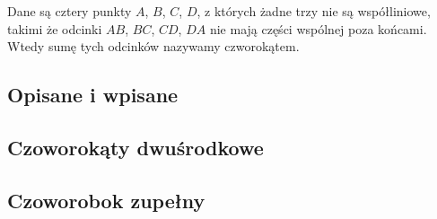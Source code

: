 %

\begin{definition}[czworokąt]
	Dane są cztery punkty $A$, $B$, $C$, $D$, z których żadne trzy nie są współliniowe, takimi że odcinki $AB$, $BC$, $CD$, $DA$ nie mają części wspólnej poza końcami.
    Wtedy sumę tych odcinków nazywamy czworokątem.
\end{definition}



\subsection{Opisane i wpisane}


\subsection{Czoworokąty dwuśrodkowe}


%
%
\subsection{Czoworobok zupełny}

%





%